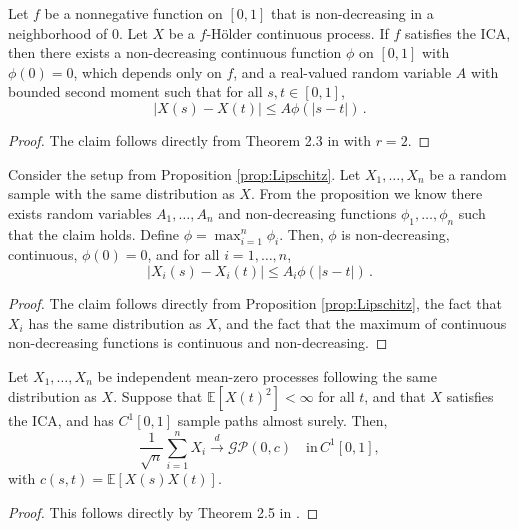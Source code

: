 \begin{proposition}\label{prop:Lipschitz}
    Let $f$ be a nonnegative function on $[0, 1]$ that is non-decreasing in a neighborhood of $0$.
    Let $X$ be a $f$-H\"older continuous process. If $f$ satisfies the ICA, then there exists a
    non-decreasing continuous function $\phi$ on $[0, 1]$ with $\phi(0) = 0$, which depends only on
    $f$, and a real-valued random variable $A$ with bounded second moment such that for all $s, t
    \in [0, 1]$,
    \[
        |X(s) - X(t)| \leq A \phi(|s - t|) \,.
    \]
\end{proposition}
\begin{proof}
    The claim follows directly from Theorem 2.3 in \cite{hahn1977} with $r = 2$.
\end{proof}

\begin{corollary}\label{cor:Lipschitz}
    Consider the setup from Proposition \ref{prop:Lipschitz}. Let $X_1, \dots, X_n$ be a random
    sample with the same distribution as $X$. From the proposition we know there exists random
    variables $A_1, \dots, A_n$ and non-decreasing functions $\phi_1, \dots, \phi_n$ such that the
    claim holds. Define $\phi = \max_{i = 1}^n \phi_i$. Then, $\phi$ is non-decreasing, continuous,
    $\phi(0) = 0$, and for all $i = 1, \dots, n$,
    \[
        |X_i(s) - X_i(t)| \leq A_i \phi(|s - t|) \,.
    \]
\end{corollary}
\begin{proof}
    The claim follows directly from Proposition \ref{prop:Lipschitz}, the fact that $X_i$ has the
    same distribution as $X$, and the fact that the maximum of continuous non-decreasing functions
    is continuous and non-decreasing.
\end{proof}


\begin{theorem}\label{thm:fclt}
    Let $X_1, \dots, X_n$ be independent mean-zero processes following the same distribution as $X$.
    Suppose that $\mathbb{E}[X(t)^2] < \infty$ for all $t$, and that $X$ satisfies the ICA, and has
    $C^1[0, 1]$ sample paths almost surely. Then,
    \[
        \frac{1}{\sqrt{n}} \sum_{i = 1}^n X_i \overset{d}{\to} \mathcal{GP}(0, c)
        \quad \text{in} \, C^1[0, 1],
    \]
    with $c(s, t) = \mathbb{E}[X(s) X(t)]$.
\end{theorem}
\begin{proof}
    This follows directly by Theorem 2.5 in \cite{hahn1977}.
\end{proof}


